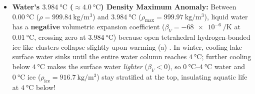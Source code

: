 \begin{itemize}
  \item \textbf{Water's $\SI{3.984}{\celsius}$ ($\approx\SI{4.0}{\celsius}$) Density Maximum Anomaly:} Between $\SI{0.00}{\celsius}$ ($\rho = \SI{999.84}{\kilogram\per\cubic\meter}$) and $\SI{3.984}{\celsius}$ ($\rho_{\max} = \SI{999.97}{\kilogram\per\cubic\meter}$), liquid water has a \textbf{negative} volumetric expansion coefficient ($\beta_V = \SI{-68e-6}{\per\kelvin}$ at $\SI{0.01}{\celsius}$, crossing zero at $\SI{3.984}{\celsius}$) because open tetrahedral hydrogen-bonded ice-like clusters collapse slightly upon warming (a) . In winter, cooling lake surface water sinks until the entire water column reaches $\SI{4}{\celsius}$; further cooling below $\SI{4}{\celsius}$ makes the surface water \emph{lighter} ($\beta_V < 0$), so $\SIrange{0}{4}{\celsius}$ water and $\SI{0}{\celsius}$ ice ($\rho_{\mathrm{ice}} = \SI{916.7}{\kilogram\per\cubic\meter}$) stay stratified at the top, insulating aquatic life at $\SI{4}{\celsius}$ below!
\end{itemize}

